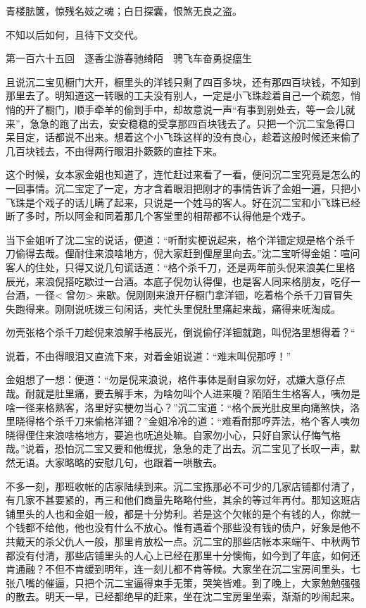 \documentclass[12pt,UTF8]{ctexbook}
\begin{document}
{{{青楼胠箧，惊残名妓之魂；白日探囊，恨煞无良之盗。

不知以后如何，且待下文交代。





第一百六十五回　逐香尘游春驰绮陌　骋飞车奋勇捉瘟生



且说沉二宝见橱门大开，橱里头的洋钱只剩了四百多块，还有那四百块钱，不知到那里去了。明知道这一转眼的工夫没有别人，一定是小飞珠趁着自己一个疏忽，悄悄的开了橱门，顺手牵羊的偷到手中，却故意说一声“有事到别处去，等一会儿就来”，急急的跑了出去，安安稳稳的受享那四百块钱去了。只把一个沉二宝急得口呆目定，话都说不出来。想着这个小飞珠这样的没有良心，趁着这般时候还来偷了几百块钱去，不由得两行眼泪扑簌簌的直挂下来。

这个时候，女本家金姐也知道了，连忙赶过来看了一看，便问沉二宝究竟是怎么的一回事情。沉二宝定了一定，方才含着眼泪把刚才的事情告诉了金姐一遍，只把小飞珠是个戏子的话儿瞒了起来，只说是一个姓马的客人。好在沉二宝和小飞珠已经断了多时，所以阿金和同着那几个客堂里的相帮都不认得他是个戏子。

当下金姐听了沈二宝的说话，便道：“听耐实梗说起来，格个洋钿定规是格个杀千刀偷得去哉。俚耐住来浪啥地方，倪大家赶到俚屋里向去。”沈二宝听得金姐：喧问客人的住处，只得又说几句谎话道：“格个杀千刀，还是两年前头倪来浪美仁里格辰光，来浪倪搭吃歇过一台酒。本底子倪勿认得俚，也是客人同来格朋友，吃仔一台酒，一径< 曾勿> 来歇。倪刚刚来浪开仔橱门拿洋钿，吃着格个杀千刀冒冒失失跑得来。刚刚说呒拨三句闲话，夹忙头里倪肚里痛起来哉，痛得来呒淘成。

勿壳张格个杀千刀趁倪来浪解手格辰光，倒说偷仔洋钿就跑，叫倪洛里想得着？“

说着，不由得眼泪又直流下来，对着金姐说道：“难末叫倪那哼！”

金姐想了一想：便道：“勿是倪来浪说，格件事体是耐自家勿好，忒嫌大意仔点哉。耐就是肚里痛，要去解手末，为啥勿叫个人进来嗄？陌陌生生格客人，咦勿是啥一径来格熟客，洛里好实梗勿当心？”沉二宝道：“格个辰光肚皮里向痛煞快，洛里晓得格个杀千刀来偷格洋钿？”金姐冷冷的道：“难看耐那哼弄法，格个客人咦勿晓得俚住来浪啥格地方，要追也呒追处嘛。自家勿小心，只好自家认仔悔气格哉。”说着，恐怕沉二宝又要和他缠扰，急急的走了出去。沉二宝见了长叹一声，默然无语。大家略略的安慰几句，也跟着一哄散去。

不多一刻，那班收帐的店家陆续到来。沉二宝拣那必不可少的几家店铺都付清了，有几家不甚要紧的，再三和他们商量先略略付些，其余的等过年再付。那知这班店铺里头的人也和金姐一般，都是十分势利。若是这个欠帐的是个有钱的人，你就一个钱都不给他，他也没有什么不放心。惟有遇着个那些没有钱的债户，好象是他不共戴天的杀父仇人一般，那里肯放松一点。沉二宝的那些店帐本来端午、中秋两节都没有付清，那些店铺里头的人心上已经在那里十分懊悔，如今到了年底，如何还肯通融？不但不肯缓到明年，连一刻儿都不肯等候。大家坐在沉二宝房间里头，七张八嘴的催逼，只把个沉二宝逼得束手无策，哭笑皆难。到了晚上，大家勉勉强强的散去。明天一早，已经都绝早的赶来，坐在沈二宝房里坐索，渐渐的吵闹起来。

}}}
\end{document}
